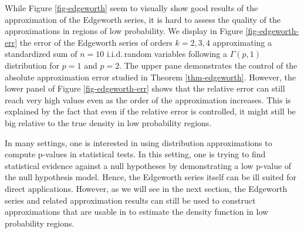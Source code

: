 \begin{example}
    While Figure \ref{fig-edgeworth} seem to visually show good results of the approximation of the Edgeworth series, it is hard to assess the quality of the approximations in regions of low probability. We display in Figure \ref{fig-edgeworth-err} the error of the Edgeworth series of orders $k=2,3,4$ approximating a standardized sum of $n=10$ i.i.d.\,random variables following a $\Gamma(p, 1)$ distribution for $p=1$ and $p=2$. The upper pane demonstrates the control of the absolute approximation error studied in Theorem \ref{thm-edgeworth}. However, the lower panel of Figure \ref{fig-edgeworth-err} shows that the relative error can still reach very high values even as the order of the approximation increases. This is explained by the fact that even if the relative error is controlled, it might still be big relative to the true density in low probability regions.

    In many settings, one is interested in using distribution approximations to compute p-values in statistical tests. In this setting, one is trying to find statistical evidence against a null hypotheses by demonstrating a low p-value of the null hypothesis model. Hence, the Edgeworth series itself can be ill suited for direct applications. However, as we will see in the next section, the Edgeworth series and related approximation results can still be used to construct approximations that are usable in to estimate the density function in low probability regions.
\end{example}